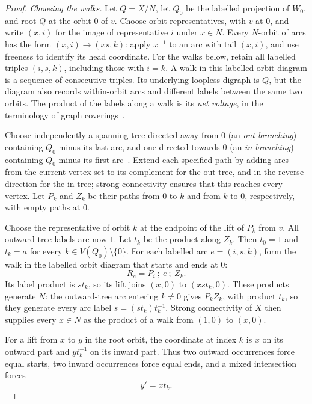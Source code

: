 \documentclass[11pt,a4paper,reqno]{amsart}
\theoremstyle{definition}
\theoremstyle{remark}
\numberwithin{equation}{section}
\begin{document}
\begin{proof}
\emph{Choosing the walks.}
Let $Q=X/N$, let $Q_0$ be the labelled projection of $W_0$, and root $Q$ at the orbit $0$ of $v$. Choose orbit representatives, with $v$ at $0$, and write $(x,i)$ for the image of representative $i$ under $x\in N$. Every $N$-orbit of arcs has the form $(x,i)\to(xs,k)$: apply $x^{-1}$ to an arc with tail $(x,i)$, and use freeness to identify its head coordinate. For the walks below, retain all labelled triples $(i,s,k)$, including those with $i=k$. A walk in this labelled orbit diagram is a sequence of consecutive triples. Its underlying loopless digraph is $Q$, but the diagram also records within-orbit arcs and different labels between the same two orbits. The product of the labels along a walk is its \emph{net voltage}, in the terminology of graph coverings~\cite{GrossTucker}.

Choose independently a spanning tree directed away from $0$ (an \emph{out-branching}) containing $Q_0$ minus its last arc, and one directed towards $0$ (an \emph{in-branching}) containing $Q_0$ minus its first arc~\cite[Section 1.7]{BangJensenGutin}. Extend each specified path by adding arcs from the current vertex set to its complement for the out-tree, and in the reverse direction for the in-tree; strong connectivity ensures that this reaches every vertex. Let $P_k$ and $Z_k$ be their paths from $0$ to $k$ and from $k$ to $0$, respectively, with empty paths at $0$.

Choose the representative of orbit $k$ at the endpoint of the lift of $P_k$ from $v$. All outward-tree labels are now $1$. Let $t_k$ be the product along $Z_k$. Then $t_0=1$ and $t_k=a$ for every $k\in V(Q_0)\setminus\{0\}$. For each labelled arc $e=(i,s,k)$, form the walk in the labelled orbit diagram that starts and ends at $0$:
\begin{equation}\label{eq:returnwalk}
 R_e=P_i\ ;\ e\ ;\ Z_k.
\end{equation}
Its label product is $st_k$, so its lift joins $(x,0)$ to $(xst_k,0)$. These products generate $N$: the outward-tree arc entering $k\ne0$ gives $P_kZ_k$, with product $t_k$, so they generate every arc label $s=(st_k)t_k^{-1}$. Strong connectivity of $X$ then supplies every $x\in N$ as the product of a walk from $(1,0)$ to $(x,0)$.

For a lift from $x$ to $y$ in the root orbit, the coordinate at index $k$ is $x$ on its outward part and $yt_k^{-1}$ on its inward part. Thus two outward occurrences force equal starts, two inward occurrences force equal ends, and a mixed intersection forces
\begin{equation}\label{eq:collision}
 y'=xt_k.
\end{equation}


\end{proof}
\end{document}
